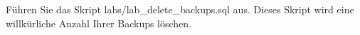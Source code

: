    \item F\"uhren Sie das Skript labs/lab\_delete\_backups.sql aus. Dieses Skript wird eine will\-k\"ur\-liche Anzahl Ihrer Backups l\"oschen.
